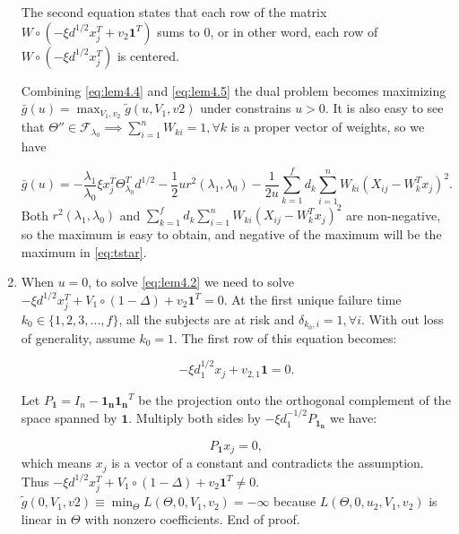 \begin{enumerate}
The second equation states that each row of the matrix $W\circ\left( -\xi d^{1/2} x_j^T+v_2\mathbf{1}^T\right)$ sums to 0, or in other word, each row of $W\circ\left(-\xi d^{1/2}x_j^T\right)$ is centered.

Combining \eqref{eq:lem4.4} and \eqref{eq:lem4.5} the dual problem  becomes maximizing $\bar{g}(u)=\max_{V_1,v_2}\tilde{g}(u,V_1,v2)$ under constrains $u>0$. It is also easy to see that $\Theta''\in\mathcal{F}_{\lambda_0}\implies\sum_{i=1}^nW_{ki}=1,\forall k$ is a proper vector of weights, so we have

\begin{equation}
    \label{eq:lem4.6}
    \bar{g}(u)=-\frac{\lambda_1}{\lambda_0}\xi x_j^T\Theta_{\lambda_0}^Td^{1/2}-\frac{1}{2}ur^2(\lambda_1,\lambda_0)-\frac{1}{2u}\sum_{k=1}^fd_k\sum_{i=1}^nW_{ki}\left(X_{ij}-W_k^Tx_j\right)^2.
\end{equation}
 Both $r^2(\lambda_1,\lambda_0)$ and $\sum_{k=1}^fd_k\sum_{i=1}^nW_{ki}\left(X_{ij}-W_k^Tx_j\right)^2$ are non-negative, so the maximum is easy to obtain, and negative of the maximum will be the maximum in \eqref{eq:tstar}.

\item When $u=0$, to solve \eqref{eq:lem4.2} we need to solve $-\xi d^{1/2} x_j^T+V_1\circ(1-\Delta)+v_2\mathbf{1}^T=0.$ At the first unique failure time $k_0\in\{1,2,3,...,f\}$, all the subjects are at risk and $\delta_{k_0,i}=1,\forall i$. With out loss of generality, assume $k_0=1$. The first row of this equation becomes:

\begin{equation}
    -\xi d_1^{1/2}x_j + v_{2,1}\mathbf{1}=0.
\end{equation}

Let $P_{\mathbf{1}}=I_n-\mathbf{1_n}\mathbf{1_n}^T$ be the projection onto the orthogonal complement of the space spanned by $\mathbf{1}$. Multiply both sides by $-\xi d^{-1/2}_1P_{\mathbf{1_n}}$ we have:

\begin{equation}
    \label{eq:lem4.7}
     P_{\mathbf{1}}x_j=0,
\end{equation}
which means $x_j$ is a vector of a constant and contradicts the assumption. Thus $-\xi d^{1/2} x_j^T+V_1\circ(1-\Delta)+v_2\mathbf{1}^T\neq0.$ $\tilde{g}(0,V_1,v2)\equiv\min_\Theta L(\Theta,0,V_1,v_2)=-\infty$ because $L(\Theta,0,u_2,V_1,v_2)$ is linear in $\Theta$ with nonzero coefficients. End of proof.


\end{enumerate}


